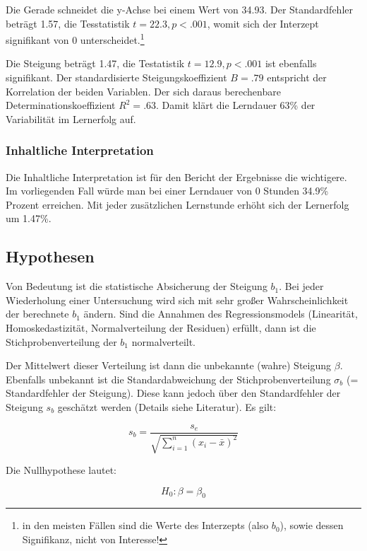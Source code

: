 \documentclass[
]{article}
\begin{document}
Die Gerade schneidet die y-Achse bei einem Wert von 34.93. Der Standardfehler beträgt 1.57, die Tesstatistik \(t = 22.3, p < .001\), womit sich der Interzept signifikant von 0 unterscheidet.\footnote{in den meisten Fällen sind die Werte des Interzepts (also \(b_0\)), sowie dessen Signifikanz, nicht von Interesse!}

Die Steigung beträgt 1.47, die Testatistik \(t = 12.9, p < .001\) ist ebenfalls signifikant. Der standardisierte Steigungskoeffizient \(B = .79\) entspricht der Korrelation der beiden Variablen. Der sich daraus berechenbare Determinationskoeffizient \(R^2 = .63\). Damit klärt die Lerndauer 63\% der Variabilität im Lernerfolg auf.

\subsubsection*{Inhaltliche Interpretation}\label{inhaltliche-interpretation}

Die Inhaltliche Interpretation ist für den Bericht der Ergebnisse die wichtigere. Im vorliegenden Fall würde man bei einer Lerndauer von 0 Stunden 34.9\% Prozent erreichen. Mit jeder zusätzlichen Lernstunde erhöht sich der Lernerfolg um 1.47\%.

\subsection*{Hypothesen}\label{hypothesen}

Von Bedeutung ist die statistische Absicherung der Steigung \(b_1\). Bei jeder Wiederholung einer Untersuchung wird sich mit sehr großer Wahrscheinlichkeit der berechnete \(b_1\) ändern. Sind die Annahmen des Regressionsmodels (Linearität, Homoskedastizität, Normalverteilung der Residuen) erfüllt, dann ist die Stichprobenverteilung der \(b_1\) normalverteilt.

Der Mittelwert dieser Verteilung ist dann die unbekannte (wahre) Steigung \(\beta\). Ebenfalls unbekannt ist die Standardabweichung der Stichprobenverteilung \(\sigma_b\) (= Standardfehler der Steigung). Diese kann jedoch über den Standardfehler der Steigung \(s_b\) geschätzt werden (Details siehe Literatur). Es gilt:

\[s_b = \frac{s_e}{\sqrt{ \sum_{i=1}^{n} (x_i - \bar{x})^2}}\]

Die Nullhypothese lautet:

\[H_0: \beta = \beta_0\]
\end{document}
